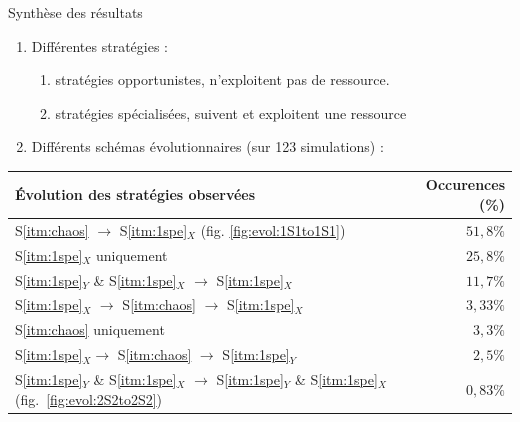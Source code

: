 \documentclass[8pt, handout=show,notes=show]{beamer}
\begin{document}
	\begin{frame}{Synthèse des résultats}
		\begin{enumerate}
		 \item Différentes stratégies : 		
		\vfil
			\begin{enumerate}[S1:]%
			\item stratégies opportunistes\label{itm:chaos}, n'exploitent pas de ressource.
			\vfill
			\item stratégies spécialisées\label{itm:1spe}, suivent et exploitent une ressource
			\end{enumerate}%
		\vfill
		\item Différents schémas évolutionnaires (sur 123 simulations) :
		\end{enumerate}
\begin{table}[H]
	\small
	\centering
	\label{tab:res:strat}
	
	\begin{tabular}{lr} 
	
	\textbf{\'{E}volution des stratégies observées} & \textbf{Occurences (\%)} \\ \hline
	S\ref{itm:chaos} $\rightarrow$  S\ref{itm:1spe}$_X$ 		(fig. \ref{fig:evol:1S1to1S1})	 	& $51,8\%$\\
	S\ref{itm:1spe}$_X$ uniquement 			& $25,8\%$\\
	S\ref{itm:1spe}$_Y$ \& S\ref{itm:1spe}$_X$  $\rightarrow$ S\ref{itm:1spe}$_X$ 	 	& $11,7\%$ \\
	S\ref{itm:1spe}$_X$ $\rightarrow$ S\ref{itm:chaos} $\rightarrow$  S\ref{itm:1spe}$_X$ 			& $3,33\%$\\
	S\ref{itm:chaos} uniquement 						& $3,3\%$ \\
	S\ref{itm:1spe}$_X \rightarrow$ S\ref{itm:chaos} $\rightarrow$ S\ref{itm:1spe}$_Y$ 			& $2,5\%$\\
	S\ref{itm:1spe}$_Y$ \& S\ref{itm:1spe}$_X$  $\rightarrow$ S\ref{itm:1spe}$_Y$ \& S\ref{itm:1spe}$_X$ (fig.~\ref{fig:evol:2S2to2S2})	& $0,83\%$ \\
	\end{tabular}
	

\end{table}
\end{frame}
\end{document}
